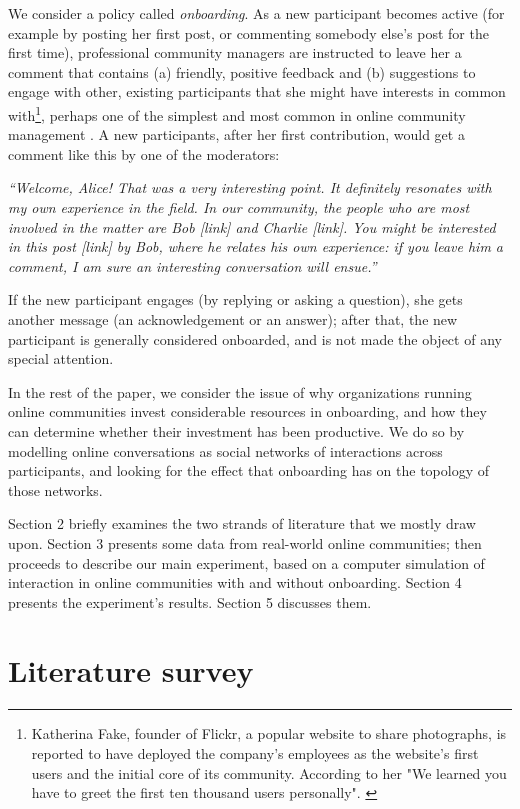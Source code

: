 \documentclass{nws}
\begin{document}
We consider a policy called \emph{onboarding}. As a new participant becomes active (for example by posting her first post, or commenting somebody else's post for the first time), professional community managers are instructed to leave her a comment that contains (a) friendly, positive feedback and (b) suggestions to engage with other, existing participants that she might have interests in common with\footnote{Katherina Fake, founder of Flickr, a popular website to share photographs, is reported to have deployed the company's employees as the website's first users and the initial core of its community. According to her "We learned you have to greet the first ten thousand users personally". \cite{shirky2008here}}, perhaps one of the simplest and most common in online community management \cite{rheingold1993virtual, shirky2008here}. A new participants, after her first contribution, would get a comment like this by one of the moderators:

\emph{``Welcome, Alice! That was a very interesting point. It definitely resonates with my own experience in the field. In our community, the people who are most involved in the matter are Bob [link] and Charlie [link]. You might be interested in this post [link] by Bob, where he relates his own experience: if you leave him a comment, I am sure an interesting conversation will ensue.''}

If the new participant engages (by replying or asking a question), she gets another message (an acknowledgement or an answer); after that, the new participant is generally considered onboarded, and is not made the object of any special attention.

In the rest of the paper, we consider the issue of why organizations running online communities invest considerable resources in onboarding, and how they can determine whether their investment has been productive. We do so by modelling online conversations as social networks of interactions across participants, and looking for the effect that onboarding has on the topology of those networks.

Section 2 briefly examines the two strands of literature that we mostly draw upon. Section 3 presents some data from real-world online communities; then proceeds to describe our main experiment, based on a computer simulation of interaction in online communities with and without onboarding. Section 4 presents the experiment's results. Section 5 discusses them.

\section{Literature survey}
\end{document}
